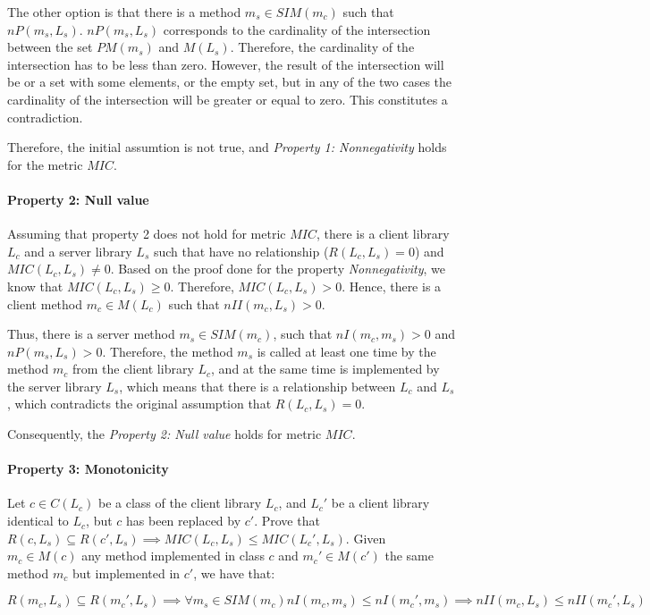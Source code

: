 The other option is that there is a method $m_s \in SIM(m_c)$ such that $nP(m_s, L_s)$. $nP(m_s, L_s)$ corresponds to the cardinality of the intersection between the set $PM(m_s)$ and $M(L_s)$. Therefore, the cardinality of the intersection has to be less than zero. However, the result of the intersection will be or a set with some elements, or the empty set, but in any of the two cases the cardinality of the intersection will be greater or equal to zero. This constitutes a contradiction.

Therefore, the initial assumtion is not true, and \textit{Property 1: Nonnegativity} holds for the metric $MIC$.

\paragraph{Property 2: Null value}
Assuming that property 2 does not hold for metric $MIC$, there is a client library $L_c$ and a server library $L_s$ such that have no relationship ($R(L_c, L_s) = 0$) and $MIC(L_c, L_s)	\neq 0$. Based on the proof done for the property \textit{Nonnegativity}, we know that $MIC(L_c, L_s) \ge 0$. Therefore, $MIC(L_c, L_s) > 0$. Hence, there is a client method $m_c \in M(L_c)$ such that $nII(m_c, L_s) > 0$.

Thus, there is a server method $m_s \in SIM(m_c)$, such that $nI(m_c, m_s) > 0$ and $nP(m_s, L_s) > 0$. Therefore, the method $m_s$ is called at least one time by the method $m_c$ from the client library $L_c$, and at the same time is implemented by the server library $L_s$, which means that there is a relationship between $L_c$ and $L_s$, which contradicts the original assumption that $R(L_c, L_s) = 0$.

Consequently, the \textit{Property 2: Null value} holds for metric $MIC$.

\paragraph{Property 3: Monotonicity}
Let $c \in C(L_c)$ be a class of the client library $L_c$, and $L_c'$ be a client library identical to $L_c$, but $c$ has been replaced by $c'$. Prove that $R(c, L_s) \subseteq R(c', L_s) \implies MIC(L_c, L_s) \le MIC(L_c', L_s)$. Given $m_c \in M(c)$ any method implemented in class $c$ and $m_c' \in M(c')$ the same method $m_c$ but implemented in $c'$, we have that:

\begin{equation*}
   R(m_c, L_s) \subseteq R(m_c', L_s) \implies \forall m_s \in SIM(m_c)  nI(m_c, m_s) \le nI(m_c', m_s) \implies nII(m_c, L_s) \le nII(m_c', L_s)
\end{equation*}

